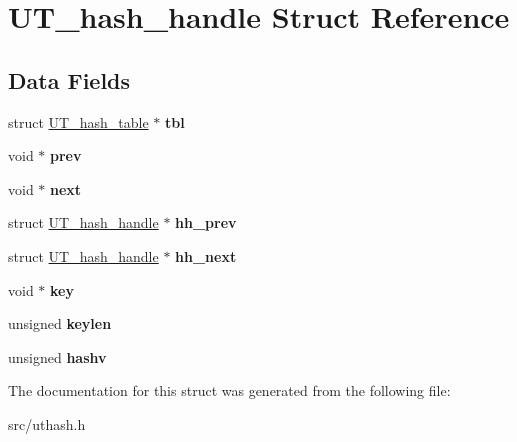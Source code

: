 \hypertarget{structUT__hash__handle}{\section{U\+T\+\_\+hash\+\_\+handle Struct Reference}
\label{structUT__hash__handle}
}
\subsection*{Data Fields}
\begin{DoxyCompactItemize}
\item 
\hypertarget{structUT__hash__handle_ad2035ee3b2aa55b22e352341372a5e73}{struct \hyperlink{structUT__hash__table}{U\+T\+\_\+hash\+\_\+table} $\ast$ {\bfseries tbl}}\label{structUT__hash__handle_ad2035ee3b2aa55b22e352341372a5e73}

\item 
\hypertarget{structUT__hash__handle_abaf54a69367933df2d45575f48ca6a58}{void $\ast$ {\bfseries prev}}\label{structUT__hash__handle_abaf54a69367933df2d45575f48ca6a58}

\item 
\hypertarget{structUT__hash__handle_a93bc88ffe97f85ea0d9e0056b7118942}{void $\ast$ {\bfseries next}}\label{structUT__hash__handle_a93bc88ffe97f85ea0d9e0056b7118942}

\item 
\hypertarget{structUT__hash__handle_a3ec03e34d7975d5c1981c44b324619b2}{struct \hyperlink{structUT__hash__handle}{U\+T\+\_\+hash\+\_\+handle} $\ast$ {\bfseries hh\+\_\+prev}}\label{structUT__hash__handle_a3ec03e34d7975d5c1981c44b324619b2}

\item 
\hypertarget{structUT__hash__handle_a4f6989385499ba6f594b0f0facd28325}{struct \hyperlink{structUT__hash__handle}{U\+T\+\_\+hash\+\_\+handle} $\ast$ {\bfseries hh\+\_\+next}}\label{structUT__hash__handle_a4f6989385499ba6f594b0f0facd28325}

\item 
\hypertarget{structUT__hash__handle_a40690fc15aeaeba8f25385f05f84dd4d}{void $\ast$ {\bfseries key}}\label{structUT__hash__handle_a40690fc15aeaeba8f25385f05f84dd4d}

\item 
\hypertarget{structUT__hash__handle_af2abdc405972a6bbdee2ade2c0f346c4}{unsigned {\bfseries keylen}}\label{structUT__hash__handle_af2abdc405972a6bbdee2ade2c0f346c4}

\item 
\hypertarget{structUT__hash__handle_aae5e635fa110556e5007f627089f8323}{unsigned {\bfseries hashv}}\label{structUT__hash__handle_aae5e635fa110556e5007f627089f8323}

\end{DoxyCompactItemize}


The documentation for this struct was generated from the following file\+:\begin{DoxyCompactItemize}
\item 
src/uthash.\+h\end{DoxyCompactItemize}
